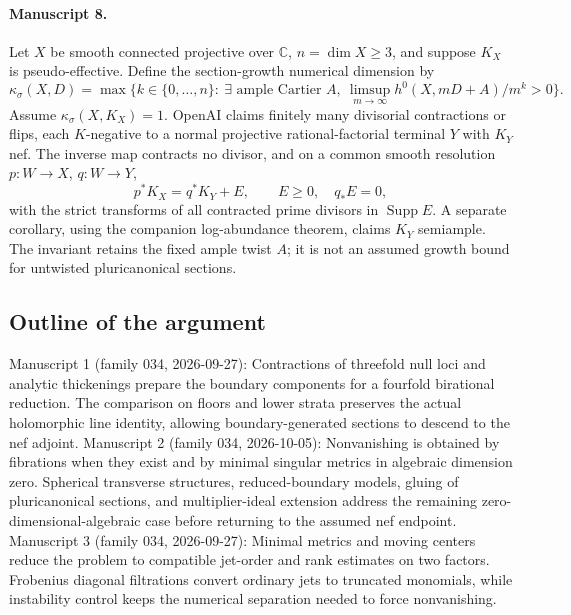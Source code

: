 \documentclass[11pt]{article}
\begin{document}
\paragraph{Manuscript 8.}
Let $X$ be smooth connected projective over $\mathbb C$, $n=\dim X\ge3$, and suppose $K_X$ is pseudo-effective. Define the section-growth numerical dimension by
\[
\kappa_\sigma(X,D)=\max\{k\in\{0,\ldots,n\}:\ \exists\text{ ample Cartier }A,\ \limsup_{m\to\infty}h^0(X,mD+A)/m^k>0\}.
\]
Assume $\kappa_\sigma(X,K_X)=1$. OpenAI claims finitely many divisorial contractions or flips, each $K$-negative to a normal projective rational-factorial terminal $Y$ with $K_Y$ nef. The inverse map contracts no divisor, and on a common smooth resolution $p:W\to X$, $q:W\to Y$,
\[
p^*K_X=q^*K_Y+E,\qquad E\ge0,\quad q_*E=0,
\]
with the strict transforms of all contracted prime divisors in $\operatorname{Supp}E$. A separate corollary, using the companion log-abundance theorem, claims $K_Y$ semiample. The invariant retains the fixed ample twist $A$; it is not an assumed growth bound for untwisted pluricanonical sections.

\subsection{Outline of the argument}
Manuscript 1 (family 034, 2026-09-27): Contractions of threefold null loci and analytic thickenings prepare the boundary components for a fourfold birational reduction. The comparison on floors and lower strata preserves the actual holomorphic line identity, allowing boundary-generated sections to descend to the nef adjoint. Manuscript 2 (family 034, 2026-10-05): Nonvanishing is obtained by fibrations when they exist and by minimal singular metrics in algebraic dimension zero. Spherical transverse structures, reduced-boundary models, gluing of pluricanonical sections, and multiplier-ideal extension address the remaining zero-dimensional-algebraic case before returning to the assumed nef endpoint. Manuscript 3 (family 034, 2026-09-27): Minimal metrics and moving centers reduce the problem to compatible jet-order and rank estimates on two factors. Frobenius diagonal filtrations convert ordinary jets to truncated monomials, while instability control keeps the numerical separation needed to force nonvanishing.
\end{document}
